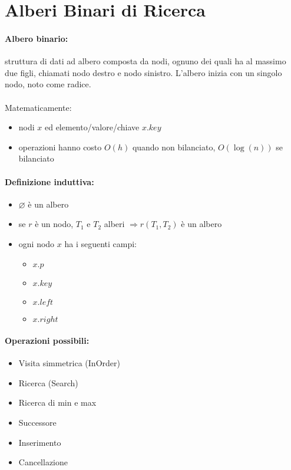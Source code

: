\section{Alberi Binari di Ricerca}
\paragraph{Albero binario:} struttura di dati ad albero composta da nodi, ognuno dei quali ha al massimo due figli, chiamati nodo destro e nodo sinistro. L'albero inizia con un singolo nodo, noto come radice. \\~\\

Matematicamente:
\begin{itemize}
    \item nodi $x$ ed elemento/valore/chiave $x.key$
    \item operazioni hanno costo $O(h)$ quando non bilanciato, $O(\log(n))$ se bilanciato
\end{itemize}

\paragraph{Definizione induttiva:}
\begin{itemize}
    \item $\varnothing$ è un albero
    \item se $r$ è un nodo, $T_1$ e $T_2$ alberi $\Rightarrow r(T_1,T_2)$ è un albero
    \item ogni nodo $x$ ha i seguenti campi:
    \begin{itemize}
        \item $x.p$
        \item $x.key$
        \item $x.left$
        \item $x.right$
    \end{itemize}
\end{itemize}

\paragraph{Operazioni possibili:}
\begin{itemize}
    \item Visita simmetrica (InOrder)
    \item Ricerca (Search)
    \item Ricerca di min e max
    \item Successore
    \item Inserimento
    \item Cancellazione
\end{itemize}

